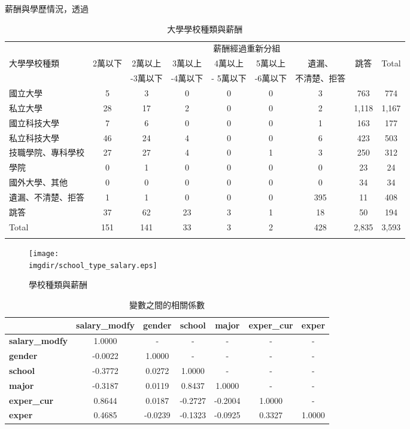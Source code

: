 \documentclass[12pt, a4paper]{article}
\begin{document}
薪酬與學歷情況，透過
\begin{table}[ht]
\centering
\renewcommand{\arraystretch}{1.3} %
\extrarowheight=4pt
\caption{大學學校種類與薪酬}
\begin{adjustbox}{width=\textwidth}
\begin{tabular}{l*{8}{c}}
\toprule
& \multicolumn{8}{c}{薪酬經過重新分組} \\
\cmidrule(lr){2-9}
大學學校種類 & 2萬以下 & 2萬以上& 3萬以上 & 4萬以上 & 5萬以上 & 遺漏、 & 跳答 & Total \\
		   &    &-3萬以下    & -4萬以下  &- 5萬以下    & -6萬以下   & 不清楚、拒答   &   &  \\
\midrule
國立大學 & 5 & 3 & 0 & 0 & 0 & 3 & 763 & 774 \\
私立大學 & 28 & 17 & 2 & 0 & 0 & 2 & 1,118 & 1,167 \\
國立科技大學 & 7 & 6 & 0 & 0 & 0 & 1 & 163 & 177 \\
私立科技大學 & 46 & 24 & 4 & 0 & 0 & 6 & 423 & 503 \\
技職學院、專科學校 & 27 & 27 & 4 & 0 & 1 & 3 & 250 & 312 \\
學院 & 0 & 1 & 0 & 0 & 0 & 0 & 23 & 24 \\
國外大學、其他 & 0 & 0 & 0 & 0 & 0 & 0 & 34 & 34 \\
遺漏、不清楚、拒答 & 1 & 1 & 0 & 0 & 0 & 395 & 11 & 408 \\
跳答 & 37 & 62 & 23 & 3 & 1 & 18 & 50 & 194 \\
Total & 151 & 141 & 33 & 3 & 2 & 428 & 2,835 & 3,593 \\
\bottomrule
\label{tab:school_wage}
\end{tabular}
\end{adjustbox}
\end{table}



\begin{figure}[H]
    \centering    
        \texttt{[image: \\imgdir/school\_type\_salary.eps]}
        \caption{學校種類與薪酬}
        \label{pic:school_salary}
\end{figure}



\begin{table}[ht]
\centering
\caption{變數之間的相關係數}
\begin{tabular}{lcccccc}
\toprule
& \textbf{salary\_modfy} & \textbf{gender} & \textbf{school} & \textbf{major} & \textbf{exper\_cur} & \textbf{exper} \\
\midrule
\textbf{salary\_modfy} & 1.0000 & - & - & - & - & - \\
\textbf{gender} & -0.0022 & 1.0000 & - & - & - & - \\
\textbf{school} & -0.3772 & 0.0272 & 1.0000 & - & - & - \\
\textbf{major} & -0.3187 & 0.0119 & 0.8437 & 1.0000 & - & - \\
\textbf{exper\_cur} & 0.8644 & 0.0187 & -0.2727 & -0.2004 & 1.0000 & - \\
\textbf{exper} & 0.4685 & -0.0239 & -0.1323 & -0.0925 & 0.3327 & 1.0000 \\
\bottomrule
\end{tabular}
\end{table}
\end{document}
